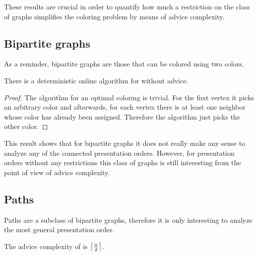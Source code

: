 These results are crucial in order to quantify how much a restriction on
the class of graphs simplifies the coloring problem by means of advice
complexity.

\subsection{Bipartite graphs}

As a reminder, bipartite graphs are those that can be colored using two
colors.


\begin{theorem}\label{theorem:bipartite-connected}
    There is a deterministic online algorithm for
     without advice.
\end{theorem}

\begin{proof}
    The algorithm for an optimal coloring is trivial. For the first vertex
    it picks an arbitrary color and afterwards, for each vertex there is
    at least one neighbor whose color has already been assigned. Therefore
    the algorithm just picks the other color.
\end{proof}

This result shows that for bipartite graphs it does not really make any
sense to analyze any of the connected presentation orders. However, for
presentation orders without any restrictions this class of graphs is still
interesting from the point of view of advice complexity.

\subsection{Paths}

Paths are a subclass of bipartite graphs, therefore it is only interesting
to analyze the most general presentation order.

\begin{theorem}\label{theorem:paths-any}
    The advice complexity of  is
    $\ceil*{\frac{n}{2}}$.
\end{theorem}

